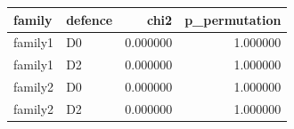\begin{tabular}{llrr}
\toprule
family & defence & chi2 & p\_permutation \\
\midrule
family1 & D0 & 0.000000 & 1.000000 \\
family1 & D2 & 0.000000 & 1.000000 \\
family2 & D0 & 0.000000 & 1.000000 \\
family2 & D2 & 0.000000 & 1.000000 \\
\bottomrule
\end{tabular}
